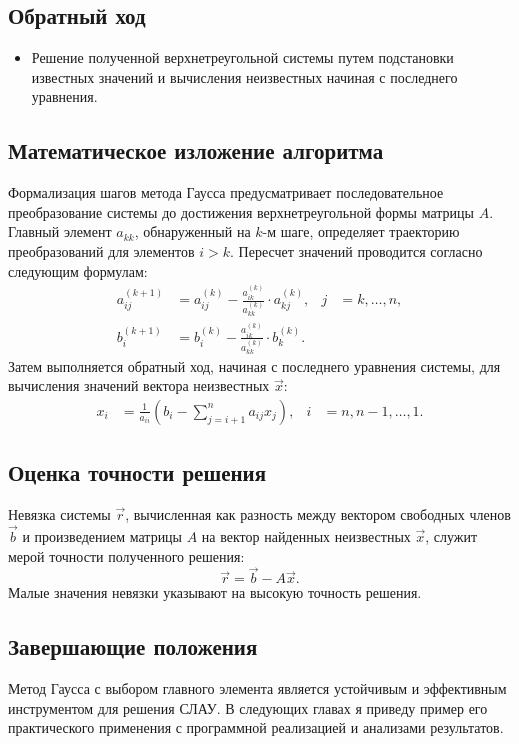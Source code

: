 \subsection{Обратный ход}
\begin{itemize}
  \item Решение полученной верхнетреугольной системы путем подстановки известных значений и вычисления неизвестных начиная с последнего уравнения.
\end{itemize}

\subsection{Математическое изложение алгоритма}
Формализация шагов метода Гаусса предусматривает последовательное преобразование системы до достижения верхнетреугольной формы матрицы \( A \). Главный элемент \( a_{kk} \), обнаруженный на \( k \)-м шаге, определяет траекторию преобразований для элементов \( i > k \). Пересчет значений проводится согласно следующим формулам:
\begin{align}
    a_{ij}^{(k+1)} &= a_{ij}^{(k)} - \frac{a_{ik}^{(k)}}{a_{kk}^{(k)}} \cdot a_{kj}^{(k)}, & j &= k, \ldots, n, \\
    b_{i}^{(k+1)} &= b_{i}^{(k)} - \frac{a_{ik}^{(k)}}{a_{kk}^{(k)}} \cdot b_{k}^{(k)}.
\end{align}
Затем выполняется обратный ход, начиная с последнего уравнения системы, для вычисления значений вектора неизвестных \( \vec{x} \):
\begin{align}
    x_i &= \frac{1}{a_{ii}} \left( b_i - \sum_{j=i+1}^{n} a_{ij} x_j \right), & i &= n, n-1, \ldots, 1.
\end{align}

\subsection{Оценка точности решения}
Невязка системы \( \vec{r} \), вычисленная как разность между вектором свободных членов \( \vec{b} \) и произведением матрицы \( A \) на вектор найденных неизвестных \( \vec{x} \), служит мерой точности полученного решения:
\begin{equation}
    \vec{r} = \vec{b} - A\vec{x}.
\end{equation}
Малые значения невязки указывают на высокую точность решения.

\subsection{Завершающие положения}
Метод Гаусса с выбором главного элемента является устойчивым и эффективным  инструментом для решения СЛАУ. В следующих главах я приведу пример его практического применения с программной реализацией и анализами результатов.

\newpage